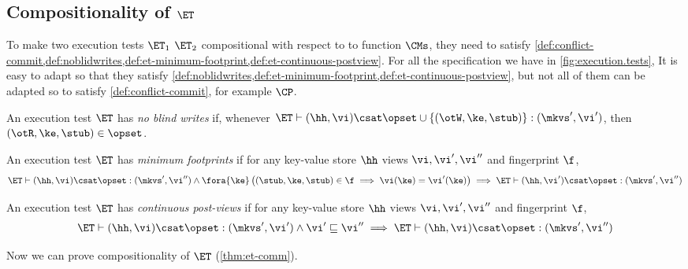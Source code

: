 \subsection{Compositionality of \( \ET \)}
\label{sec:et-comm}
\label{sec:et-comp}

To make two execution tests \( \ET_1 \) \( \ET_2 \) compositional with respect to to function \( \CMs \),
they need to satisfy \cref{def:conflict-commit,def:noblidwrites,def:et-minimum-footprint,def:et-continuous-postview}.
For all the specification we have in \cref{fig:execution.tests},
It is easy to adapt so that they satisfy \cref{def:noblidwrites,def:et-minimum-footprint,def:et-continuous-postview},
but not all of them can be adapted so to satisfy \cref{def:conflict-commit}, for example \( \CP \).

\begin{definition}
\label{def:noblidwrites}
An execution test $\ET$ has \emph{no blind writes} if, whenever $\ET \vdash (\hh, \vi) \csat \opset \cup \{(\otW, \ke, \stub)\} : (\mkvs',\vi')$, 
then $(\otR, \ke, \stub) \in \opset$.
\end{definition}

\begin{definition}
\label{def:et-minimum-footprint}
An execution test $\ET$ has \emph{minimum footprints} if for any key-value store \( \hh \)
views \( \vi, \vi',\vi''\) and fingerprint \( \f \),
\[
\begin{array}{@{}l@{}}
    \ET \vdash (\hh, \vi) \csat \opset : (\mkvs',\vi'')
\land \fora{ \ke} \left( (\stub, \ke, \stub) \in \f \implies \vi(\ke) = \vi'(\ke) \right) 
\implies \ET \vdash (\hh, \vi') \csat \opset : (\mkvs',\vi'')
\end{array}
\]
\end{definition}

\begin{definition}
\label{def:et-continuous-postview}
An execution test $\ET$ has \emph{continuous post-views} if for any key-value store \( \hh \)
views \( \vi, \vi',\vi''\) and fingerprint \( \f \), 
\[
\begin{array}{@{}l@{}}
    \ET \vdash (\hh, \vi) \csat \opset : (\mkvs',\vi') \land \vi' \sqsubseteq \vi'' \implies \ET \vdash (\hh, \vi) \csat \opset : (\mkvs',\vi'')
\end{array}
\]
\end{definition}

Now we can prove compositionality of \( \ET \) (\cref{thm:et-comm}).

